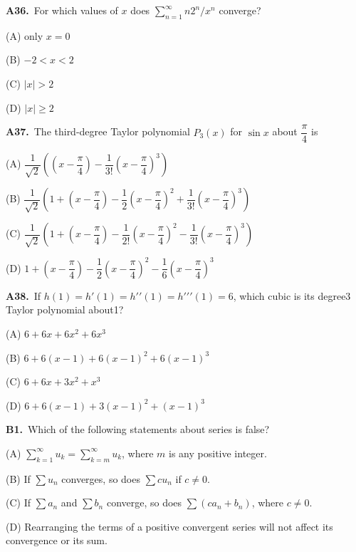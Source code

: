 \documentclass[11pt]{article}
\begin{document}
\bigskip\noindent\textbf{A36.}\ For which values of $x$ does $\sum_{n=1}^\infty n2^n/x^n$ converge?
\begin{list}{}{\setlength{\leftmargin}{3em}\setlength{\labelwidth}{2.5em}\setlength{\itemsep}{0pt}\setlength{\topsep}{2pt}}
\item[(A)] only $x=0$
\item[(B)] $-2<x<2$
\item[(C)] $|x|>2$
\item[(D)] $|x|\geq2$
\end{list}

\bigskip\noindent\textbf{A37.}\ The third-degree Taylor polynomial $P_3(x)$ for $\sin x$ about $\dfrac{\pi}{4}$ is
\begin{list}{}{\setlength{\leftmargin}{3em}\setlength{\labelwidth}{2.5em}\setlength{\itemsep}{0pt}\setlength{\topsep}{2pt}}
\item[(A)] $\dfrac{1}{\sqrt{2}}\left(\left(x-\dfrac{\pi}{4}\right)-\dfrac{1}{3!}\left(x-\dfrac{\pi}{4}\right)^3\right)$
\item[(B)] $\dfrac{1}{\sqrt{2}}\left(1+\left(x-\dfrac{\pi}{4}\right)-\dfrac{1}{2}\left(x-\dfrac{\pi}{4}\right)^2+\dfrac{1}{3!}\left(x-\dfrac{\pi}{4}\right)^3\right)$
\item[(C)] $\dfrac{1}{\sqrt{2}}\left(1+\left(x-\dfrac{\pi}{4}\right)-\dfrac{1}{2!}\left(x-\dfrac{\pi}{4}\right)^2-\dfrac{1}{3!}\left(x-\dfrac{\pi}{4}\right)^3\right)$
\item[(D)] $1+\left(x-\dfrac{\pi}{4}\right)-\dfrac{1}{2}\left(x-\dfrac{\pi}{4}\right)^2-\dfrac{1}{6}\left(x-\dfrac{\pi}{4}\right)^3$
\end{list}

\bigskip\noindent\textbf{A38.}\ If $h(1)=h\prime(1)=h\prime\prime(1)=h\prime\prime\prime(1)=6$, which cubic is its degree3 Taylor polynomial about1?
\begin{list}{}{\setlength{\leftmargin}{3em}\setlength{\labelwidth}{2.5em}\setlength{\itemsep}{0pt}\setlength{\topsep}{2pt}}
\item[(A)] $6+6x+6x^2+6x^3$
\item[(B)] $6+6(x-1)+6(x-1)^2+6(x-1)^3$
\item[(C)] $6+6x+3x^2+x^3$
\item[(D)] $6+6(x-1)+3(x-1)^2+(x-1)^3$
\end{list}

\bigskip\noindent\textbf{B1.}\ Which of the following statements about series is false?
\begin{list}{}{\setlength{\leftmargin}{3em}\setlength{\labelwidth}{2.5em}\setlength{\itemsep}{0pt}\setlength{\topsep}{2pt}}
\item[(A)] $\displaystyle\sum_{k=1}^\infty u_k = \displaystyle\sum_{k=m}^\infty u_k$, where $m$ is any positive integer.
\item[(B)] If $\displaystyle\sum u_n$ converges, so does $\displaystyle\sum cu_n$ if $c\neq 0$.
\item[(C)] If $\displaystyle\sum a_n$ and $\displaystyle\sum b_n$ converge, so does $\displaystyle\sum(ca_n+b_n)$, where $c\neq 0$.
\item[(D)] Rearranging the terms of a positive convergent series will not affect its convergence or its sum.
\end{list}
\end{document}
